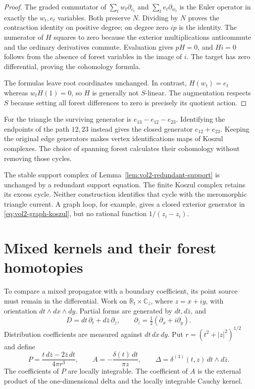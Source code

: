 \begin{proof}
The graded commutator of $\sum_tw_t\partial_{e_t}$ and
$\sum_te_t\partial_{w_t}$ is the Euler operator in exactly the
$w_t,e_t$ variables. Both preserve $N$. Dividing by $N$ proves the
contraction identity on positive degree; on degree zero $ip$ is the
identity. The numerator of $H$ squares to zero because the exterior
multiplications anticommute and the ordinary derivatives commute.
Evaluation gives $pH=0$, and $Hi=0$ follows from the absence of
forest variables in the image of $i$. The target has zero
differential, proving the cohomology formula.

The formulas leave root coordinates unchanged. In contrast,
$H(w_t)=e_t$ whereas $w_tH(1)=0$, so $H$ is generally not
$S$-linear. The augmentation respects $S$ because setting all
forest differences to zero is precisely its quotient action.
\end{proof}

For the triangle the surviving generator is
$e_{13}-e_{12}-e_{23}$. Identifying the endpoints of the path
$12,23$ instead gives the closed generator $e_{12}+e_{23}$.
Keeping the original edge generators makes vertex identifications
maps of Koszul complexes. The choice of spanning forest calculates
their cohomology without removing those cycles.

The stable support complex of
Lemma~\ref{lem:vol2-redundant-support} is unchanged by a redundant
support equation. The finite Koszul complex retains its excess
cycle. Neither construction identifies that cycle with the
meromorphic triangle current. A graph loop, for example, gives a
closed exterior generator in \eqref{eq:vol2-graph-koszul}, but no
rational function $1/(z_i-z_i)$.

\section{Mixed kernels and their forest homotopies}
\label{sec:vol2-mixed-forest-homotopies}

To compare a mixed propagator with a boundary coefficient, its
point source must remain in the differential. Work on
$\mathbb R_t\times\mathbb C_z$, where $z=x+iy$, with orientation
$dt\wedge dx\wedge dy$. Partial forms are generated by $dt,d\bar z$,
and
\[
 D=dt\,\partial_t+d\bar z\,\partial_{\bar z},\qquad
 \partial_{\bar z}=\tfrac12(\partial_x+i\partial_y).
\]
Distribution coefficients are measured against $dt\,dx\,dy$.
Put $r=(t^2+|z|^2)^{1/2}$ and define
\begin{equation}\label{eq:vol2-mixed-axial-kernels}
 P=\frac{t\,d\bar z-2\bar z\,dt}{4\pi r^3},\qquad
 A=-\frac{\delta(t)\,dt}{\pi z},\qquad
 \Delta=\delta^{(3)}(t,z)\,dt\wedge d\bar z.
\end{equation}
The coefficients of $P$ are locally integrable. The coefficient of
$A$ is the external product of the one-dimensional delta and the
locally integrable Cauchy kernel.

